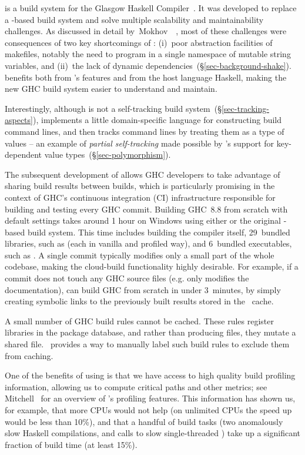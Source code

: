 \Hadrian is a build system for the Glasgow Haskell Compiler~\cite{ghc}. It was
developed to replace a \Make-based build system and solve multiple scalability
and maintainability challenges. As discussed in detail
by~Mokhov~\etal~, most of these challenges were consequences
of two key shortcomings of \Make: (i)~poor abstraction facilities of makefiles,
notably the need to program in a single namespace of mutable string variables, and
(ii)~the lack of dynamic dependencies~(\S\ref{sec-background-shake}).
\Hadrian benefits both from \Shake's features and from the host language
Haskell, making the new GHC build system easier to understand and maintain.

Interestingly, although \Shake is not a self-tracking build
system~(\S\ref{sec-tracking-aspects}), \Hadrian implements a little
domain-specific language for constructing build command lines, and then tracks
command lines by treating them as a type of values -- an example of
\emph{partial self-tracking} made possible by \Shake's support for key-dependent
value types~(\S\ref{sec-polymorphism}).

The subsequent development of \Cloud \Shake allows GHC developers to take advantage of
sharing build results between builds, which is particularly promising in the
context of GHC's continuous integration (CI) infrastructure responsible for
building and testing every GHC commit. Building GHC~8.8 from scratch with
default settings takes around 1 hour on Windows using either \Hadrian or the
original \Make-based build system. This time includes building the compiler itself,
29~bundled libraries, such as  (each in vanilla and profiled way), and
6~bundled executables, such as . A single commit typically modifies
only a small part of the whole codebase, making the cloud-build functionality
highly desirable. For example, if a commit does not touch any GHC source files
(e.g. only modifies the documentation), \Hadrian can build GHC from scratch in under
3~minutes, by simply creating symbolic links to the previously built results
stored in the \Cloud~\Shake cache.

A small number of GHC build rules cannot be cached. These rules register
libraries in the package database, and rather than producing files, they
mutate a shared file. \Cloud~\Shake provides a way to manually label such
build rules to exclude them from caching.

One of the benefits of using \Shake is that we have access to high quality build
profiling information, allowing us to compute critical paths and other metrics;
see Mitchell~ for an overview of \Shake's
profiling features. This information has shown us, for example, that more CPUs would not help (on
unlimited CPUs the speed up would be less than 10\%), and that a handful of
build tasks (two anomalously slow Haskell compilations, and calls to slow
single-threaded ) take up a significant fraction of build time
(at least 15\%).

